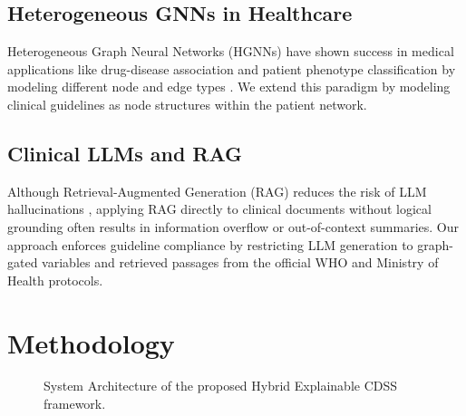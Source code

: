 \documentclass[conference]{IEEEtran}
\begin{document}
\subsection{Heterogeneous GNNs in Healthcare}
Heterogeneous Graph Neural Networks (HGNNs) have shown success in medical applications like drug-disease association and patient phenotype classification by modeling different node and edge types \cite{kipf2017,velickovic2018}. We extend this paradigm by modeling clinical guidelines as node structures within the patient network.

\subsection{Clinical LLMs and RAG}
Although Retrieval-Augmented Generation (RAG) reduces the risk of LLM hallucinations \cite{lewis2020}, applying RAG directly to clinical documents without logical grounding often results in information overflow or out-of-context summaries. Our approach enforces guideline compliance by restricting LLM generation to graph-gated variables and retrieved passages from the official WHO and Ministry of Health protocols.

\section{Methodology}
\label{sec:method}

\begin{figure}[t]
\centering
{}
\caption{System Architecture of the proposed Hybrid Explainable CDSS framework.}
\end{figure}
\end{document}
